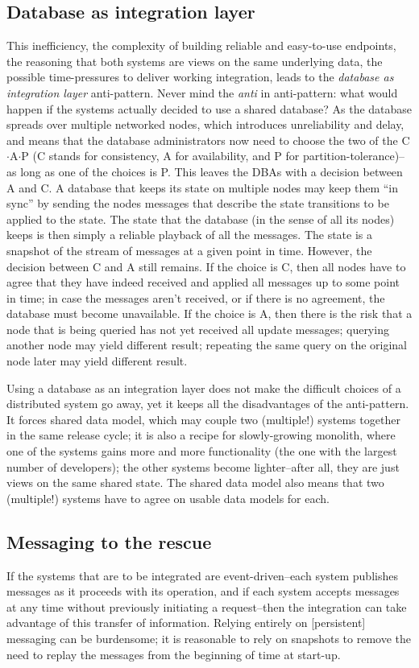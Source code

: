 \subsection{Database as integration layer}
This inefficiency, the complexity of building reliable and easy-to-use endpoints, the reasoning that both systems are views on the same underlying data, the possible time-pressures to deliver working integration, leads to the \emph{database as integration layer} anti-pattern\cite{eip}. Never mind the \emph{anti} in anti-pattern: what would happen if the systems actually decided to use a shared database? As the database spreads over multiple networked nodes, which introduces unreliability and delay, and means that the database administrators now need to choose the two of the C$\cdot$A$\cdot$P (C stands for consistency, A for availability, and P for partition-tolerance)--as long as one of the choices is P. This leaves the DBAs with a decision between A and C. A database that keeps its state on multiple nodes may keep them ``in sync'' by sending the nodes messages that describe the state transitions to be applied to the state. The state that the database (in the sense of all its nodes) keeps is then simply a reliable playback of all the messages. The state is a snapshot of the stream of messages at a given point in time. However, the decision between C and A still remains. If the choice is C, then all nodes have to agree that they have indeed received and applied all messages up to some point in time; in case the messages aren't received, or if there is no agreement, the database must become unavailable. If the choice is A, then there is the risk that a node that is being queried has not yet received all update messages; querying another node may yield different result; repeating the same query on the original node later may yield different result.

Using a database as an integration layer does not make the difficult choices of a distributed system go away, yet it keeps all the disadvantages of the anti-pattern. It forces shared data model, which may couple two (multiple!) systems together in the same release cycle; it is also a recipe for slowly-growing monolith, where one of the systems gains more and more functionality (the one with the largest number of developers); the other systems become lighter--after all, they are just views on the same shared state. The shared data model also means that two (multiple!) systems have to agree on usable data models for each.

\subsection{Messaging to the rescue}
If the systems that are to be integrated are event-driven--each system publishes messages as it proceeds with its operation, and if each system accepts messages at any time without previously initiating a request--then the integration can take advantage of this transfer of information. Relying entirely on [persistent] messaging can be burdensome; it is reasonable to rely on snapshots to remove the need to replay the messages from the beginning of time at start-up. 

